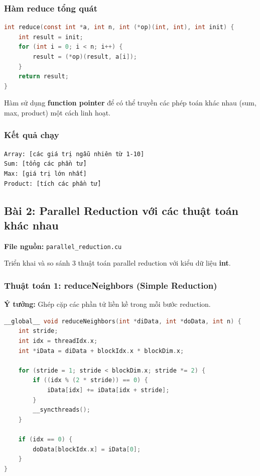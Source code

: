 \documentclass[12pt,a4paper]{article}
\begin{document}
\subsubsection{Hàm reduce tổng quát}

\begin{lstlisting}[language=C, caption=Hàm reduce tổng quát sử dụng function pointer]
int reduce(const int *a, int n, int (*op)(int, int), int init) {
    int result = init;
    for (int i = 0; i < n; i++) {
        result = (*op)(result, a[i]);
    }
    return result;
}
\end{lstlisting}

Hàm sử dụng \textbf{function pointer} để có thể truyền các phép toán khác nhau (sum, max, product) một cách linh hoạt.

\subsubsection{Kết quả chạy}

\begin{verbatim}
Array: [các giá trị ngẫu nhiên từ 1-10]
Sum: [tổng các phần tử]
Max: [giá trị lớn nhất]
Product: [tích các phần tử]
\end{verbatim}

\subsection{Bài 2: Parallel Reduction với các thuật toán khác nhau}

\textbf{File nguồn:} \texttt{parallel\_reduction.cu}

Triển khai và so sánh 3 thuật toán parallel reduction với kiểu dữ liệu \textbf{int}.

\subsubsection{Thuật toán 1: reduceNeighbors (Simple Reduction)}

\textbf{Ý tưởng:} Ghép cặp các phần tử liền kề trong mỗi bước reduction.

\begin{lstlisting}[language=C++, caption=Kernel reduceNeighbors]
__global__ void reduceNeighbors(int *diData, int *doData, int n) {
    int stride;
    int idx = threadIdx.x;
    int *iData = diData + blockIdx.x * blockDim.x;

    for (stride = 1; stride < blockDim.x; stride *= 2) {
        if ((idx % (2 * stride)) == 0) {
            iData[idx] += iData[idx + stride];
        }
        __syncthreads();
    }

    if (idx == 0) {
        doData[blockIdx.x] = iData[0];
    }
}
\end{lstlisting}
\end{document}
